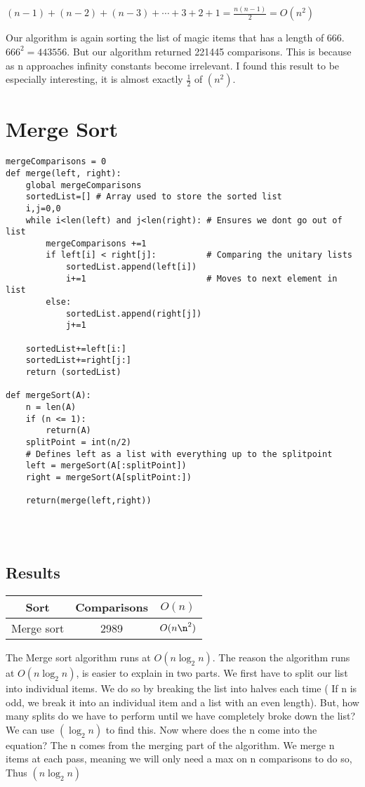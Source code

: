 \documentclass{article}
\begin{document}
$(n-1) + (n-2) + (n-3) + \cdots + 3 + 2 + 1 = \frac{n(n-1)}{2} = O(n^2)$
\vspace{2mm}

Our algorithm is again sorting the list of magic items that has a length of 666. $666^2 = 443556$. But our algorithm returned 221445 comparisons. This is because as n approaches infinity constants become irrelevant. I found this result to be especially interesting, it is almost exactly $\frac{1}{2}$ of  $(n^2)$.

\newpage

\section{Merge Sort}
\label{Merge Sort}
\begin{lstlisting}
mergeComparisons = 0
def merge(left, right):
    global mergeComparisons 
    sortedList=[] # Array used to store the sorted list
    i,j=0,0
    while i<len(left) and j<len(right): # Ensures we dont go out of list
        mergeComparisons +=1 
        if left[i] < right[j]:          # Comparing the unitary lists
            sortedList.append(left[i])
            i+=1                        # Moves to next element in list
        else:
            sortedList.append(right[j])
            j+=1

    sortedList+=left[i:]
    sortedList+=right[j:]
    return (sortedList)

def mergeSort(A):
    n = len(A)
    if (n <= 1):
        return(A)
    splitPoint = int(n/2)
    # Defines left as a list with everything up to the splitpoint
    left = mergeSort(A[:splitPoint]) 
    right = mergeSort(A[splitPoint:])

    return(merge(left,right))

    
    
\end{lstlisting}
\subsection{Results}
\begin{tabular}{c|c|c}
    Sort & Comparisons & $O(n)$ \\
\hline
    Merge sort & 2989 & $O(n\n^2)$
\end{tabular}
\vspace{5mm}

The Merge sort algorithm runs at $O(n \log_2 n )$. The reason the algorithm runs at $O(n \log_2 n )$, is easier to explain in two parts. We first have to split our list into individual items. We do so by breaking the list into halves each time ( If n is odd, we break it into an individual item and a list with an even length). But, how many splits do we have to perform until we have completely broke down the list? We can use $(\log_2n)$ to find this. Now where does the n come into the equation? The n comes from the merging part of the algorithm. We merge n items at each pass, meaning we will only need a max on n comparisons to do so, Thus $(n\log_2n)$
\end{document}
